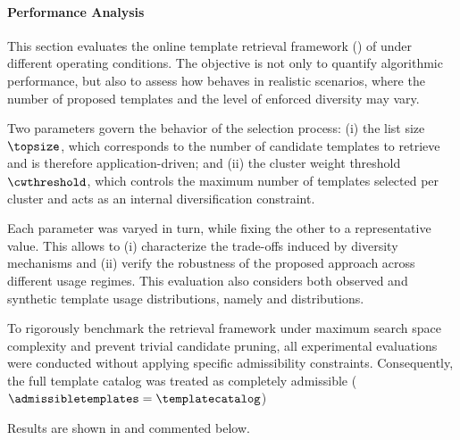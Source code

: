 \paragraph{Performance Analysis} 

This section evaluates the online template retrieval framework (\trf) of \trs under different operating conditions. The objective is not only to quantify algorithmic performance, but also to assess how \trf behaves in realistic scenarios, where the number of proposed templates and the level of enforced diversity may vary.

Two parameters govern the behavior of the selection process:  
(i) the list size $\topsize$, which corresponds to the number of candidate templates to retrieve and is therefore application-driven; and  
(ii) the cluster weight threshold $\cwthreshold$, which controls the maximum number of templates selected per cluster and acts as an internal diversification constraint.

 Each parameter was varyed in turn, while fixing the other to a representative value. This allows to (i) characterize the trade-offs induced by diversity mechanisms and (ii) verify the robustness of the proposed approach across different usage regimes. This evaluation also considers both observed and synthetic template usage distributions, namely \ODD and \ISD distributions. 
 
 To rigorously benchmark the retrieval framework under maximum search space complexity and prevent trivial candidate pruning, all experimental evaluations were conducted without applying specific admissibility constraints. Consequently, the full template catalog was treated as completely admissible ($\admissibletemplates = \templatecatalog$)

 Results are shown in  and commented below.

